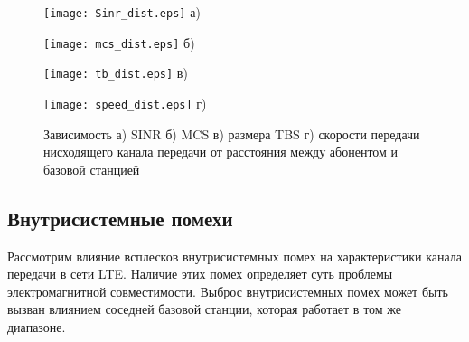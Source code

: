 \begin{figure} [!h]
\begin{minipage}[h]{0.47\linewidth}
\center
\texttt{[image: Sinr\_dist.eps]} а) \\
\end{minipage}
\hfill
\begin{minipage}[h]{0.47\linewidth}
\center
\texttt{[image: mcs\_dist.eps]} б) \\
\end{minipage}
\vfill
\begin{minipage}[h]{0.47\linewidth}
\center
\texttt{[image: tb\_dist.eps]} в) \\
\end{minipage}
\hfill
\begin{minipage}[h]{0.47\linewidth}
\center
\texttt{[image: speed\_dist.eps]} г) \\
\end{minipage}
\caption{Зависимость а) SINR б) MCS в) размера TBS г) скорости передачи нисходящего канала передачи от расстояния между абонентом и базовой станцией}
\label{img:dist}
\end{figure}

\subsection{Внутрисистемные помехи}  \label{sect2_2_3}
Рассмотрим влияние всплесков внутрисистемных помех на характеристики канала передачи в сети LTE. Наличие этих помех определяет суть проблемы электромагнитной совместимости. 
Выброс внутрисистемных помех может быть вызван влиянием соседней базовой станции, которая работает в том же диапазоне.

